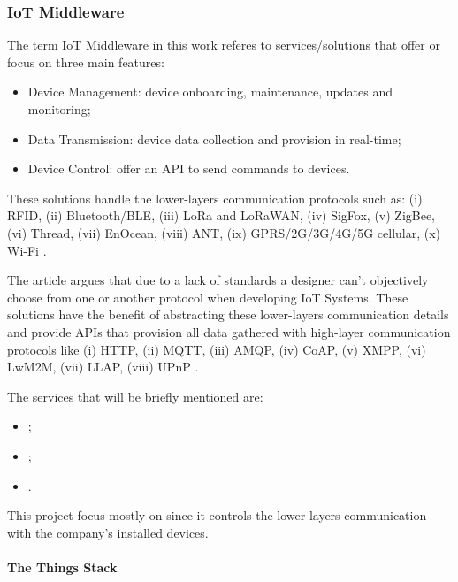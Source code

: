 \subsubsection{IoT Middleware}
\label{subsubsec:stateofart:arch:infra:middleware}

The term \gls{IoT} Middleware in this work referes to services/solutions that offer or focus on three main features:

\begin{itemize}
    \item Device Management: device onboarding, maintenance, updates and monitoring;
    \item Data Transmission: device data collection and provision in real-time;
    \item Device Control: offer an \gls{API} to send commands to devices. 
\end{itemize}

These solutions handle the lower-layers communication protocols such as: (i) RFID, (ii) Bluetooth/BLE, (iii) LoRa and LoRaWAN, (iv) SigFox, (v) ZigBee, (vi) Thread, (vii) EnOcean, (viii) ANT, (ix) GPRS/2G/3G/4G/5G cellular, (x) Wi-Fi \parencite{DIAS2022100529}.

The article  argues that due to a lack of standards a designer can't objectively choose from one or another protocol when developing \gls{IoT} Systems. These solutions have the benefit of abstracting these lower-layers communication details and provide \gls{API}s that provision all data gathered with high-layer communication protocols like (i) HTTP, (ii) \gls{MQTT}, (iii) \gls{AMQP}, (iv) CoAP, (v) XMPP, (vi) LwM2M, (vii) LLAP, (viii) UPnP \parencite{DIAS2022100529}.

The services that will be briefly mentioned are:

\begin{itemize}
    \item {};
    \item {};
    \item {}.
\end{itemize}

This project focus mostly on  since it controls the lower-layers communication with the company's installed devices.

\paragraph{The Things Stack}
\label{par:stateofart:arch:infra:middleware:ttn}

